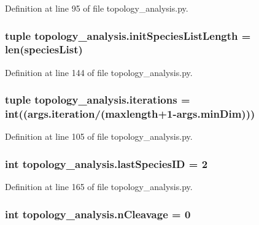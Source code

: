 Definition at line 95 of file topology\-\_\-analysis.\-py.

\hypertarget{a00157_af2370a811b14632a793a28e451be8150}{
\subsubsection[{init\-Species\-List\-Length}]{\setlength{\rightskip}{0pt plus 5cm}tuple topology\-\_\-analysis.\-init\-Species\-List\-Length = len({\bf species\-List})}}\label{a00157_af2370a811b14632a793a28e451be8150}


Definition at line 144 of file topology\-\_\-analysis.\-py.

\hypertarget{a00157_a2117e01e4647cbdecc0ece27cec1cff4}{
\subsubsection[{iterations}]{\setlength{\rightskip}{0pt plus 5cm}tuple topology\-\_\-analysis.\-iterations = int((args.\-iteration/(maxlength+1-\/args.\-min\-Dim)))}}\label{a00157_a2117e01e4647cbdecc0ece27cec1cff4}


Definition at line 105 of file topology\-\_\-analysis.\-py.

\hypertarget{a00157_a1aa5d59ebf308accb3c960b5fd90a445}{
\subsubsection[{last\-Species\-I\-D}]{\setlength{\rightskip}{0pt plus 5cm}int topology\-\_\-analysis.\-last\-Species\-I\-D = 2}}\label{a00157_a1aa5d59ebf308accb3c960b5fd90a445}


Definition at line 165 of file topology\-\_\-analysis.\-py.

\hypertarget{a00157_a9975713682889eae03088e5575e1a0e4}{
\subsubsection[{n\-Cleavage}]{\setlength{\rightskip}{0pt plus 5cm}int topology\-\_\-analysis.\-n\-Cleavage = 0}}\label{a00157_a9975713682889eae03088e5575e1a0e4}


